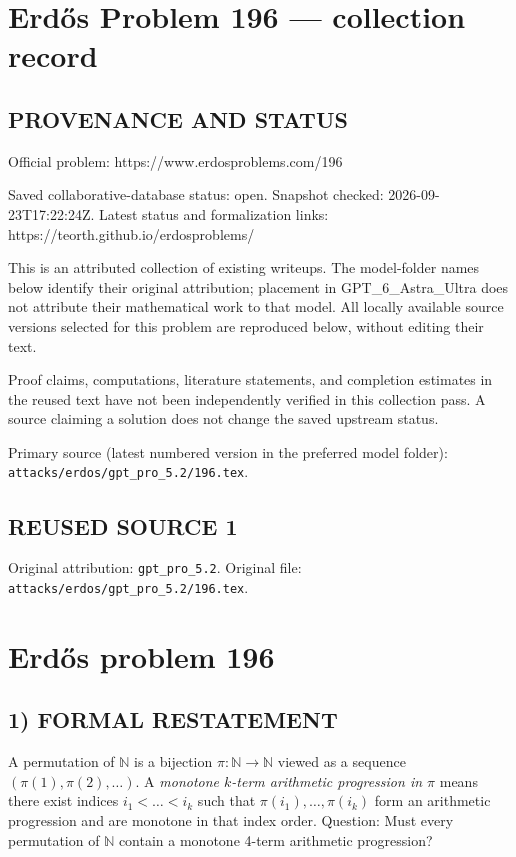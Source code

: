 \section*{Erd\H{o}s Problem 196 --- collection record}

\subsection*{PROVENANCE AND STATUS}
Official problem: https://www.erdosproblems.com/196

Saved collaborative-database status: open.
Snapshot checked: 2026-09-23T17:22:24Z.
Latest status and formalization links: https://teorth.github.io/erdosproblems/

This is an attributed collection of existing writeups. The model-folder names below identify their original attribution; placement in GPT\_6\_Astra\_Ultra does not attribute their mathematical work to that model. All locally available source versions selected for this problem are reproduced below, without editing their text.

Proof claims, computations, literature statements, and completion estimates in the reused text have not been independently verified in this collection pass. A source claiming a solution does not change the saved upstream status.

Primary source (latest numbered version in the preferred model folder): \texttt{attacks/erdos/gpt\_pro\_5.2/196.tex}.

\subsection*{REUSED SOURCE 1}
Original attribution: \texttt{gpt\_pro\_5.2}.
Original file: \texttt{attacks/erdos/gpt\_pro\_5.2/196.tex}.

\section*{Erd\H{o}s problem 196}

\subsection*{1) FORMAL RESTATEMENT}
A permutation of $\mathbb{N}$ is a bijection $\pi:\mathbb{N}\to\mathbb{N}$ viewed as a sequence $(\pi(1),\pi(2),\dots)$.
A \emph{monotone $k$-term arithmetic progression in $\pi$} means there exist indices $i_1<\dots<i_k$ such that
$\pi(i_1),\dots,\pi(i_k)$ form an arithmetic progression and are monotone in that index order.
Question: Must every permutation of $\mathbb{N}$ contain a monotone 4-term arithmetic progression?

